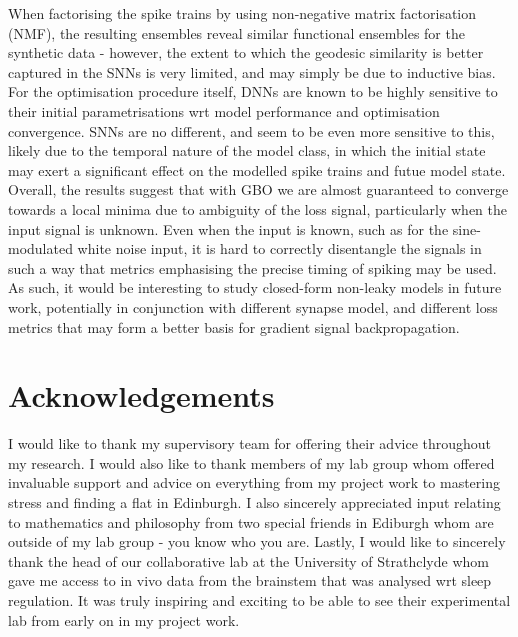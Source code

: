 \documentclass[mphil,deptreport,ianc]{infthesis} %
\begin{document}
\begin{preliminary}
{    When factorising the spike trains by using non-negative matrix factorisation (NMF), the resulting ensembles reveal similar functional ensembles for the synthetic data - however, the extent to which the geodesic similarity is better captured in the SNNs is very limited, and may simply be due to inductive bias.
    For the optimisation procedure itself, DNNs are known to be highly sensitive to their initial parametrisations wrt model performance and optimisation convergence.
    SNNs are no different, and seem to be even more sensitive to this, likely due to the temporal nature of the model class, in which the initial state may exert a significant effect on the modelled spike trains and futue model state.
    Overall, the results suggest that with GBO we are almost guaranteed to converge towards a local minima due to ambiguity of the loss signal, particularly when the input signal is unknown.
    Even when the input is known, such as for the sine-modulated white noise input, it is hard to correctly disentangle the signals in such a way that metrics emphasising the precise timing of spiking may be used.
    As such, it would be interesting to study closed-form non-leaky models in future work, potentially in conjunction with different synapse model, and different loss metrics that may form a better basis for gradient signal backpropagation.
}

\maketitle

\section*{Acknowledgements}

I would like to thank my supervisory team for offering their advice throughout my research.
I would also like to thank members of my lab group whom offered invaluable support and advice on everything from my project work to mastering stress and finding a flat in Edinburgh.
I also sincerely appreciated input relating to mathematics and philosophy from two special friends in Ediburgh whom are outside of my lab group - you know who you are.
Lastly, I would like to sincerely thank the head of our collaborative lab at the University of Strathclyde whom gave me access to in vivo data from the brainstem that was analysed wrt sleep regulation. It was truly inspiring and exciting to be able to see their experimental lab from early on in my project work.


\tableofcontents
\end{preliminary}
\end{document}
